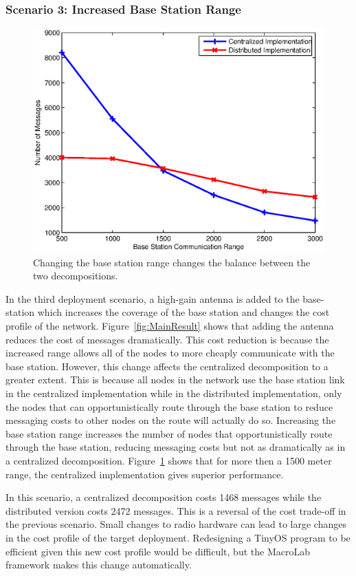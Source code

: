 \subsubsection{Scenario 3: Increased Base Station Range}

\begin{figure}
  \centering
  \includegraphics[width=0.6\columnwidth]{fig/RangeCompare}
  \caption[Effect of changing the base station range on code
  decomposition]{Changing the base station range changes the balance between the
  two decompositions.}
  \label{fig:RangeCompare}
\end{figure}

In the third deployment scenario, a high-gain antenna is added to the
base-station which increases the coverage of the base station and changes
the cost profile of the network.  Figure~\ref{fig:MainResult} shows that
adding the antenna reduces the cost of messages dramatically.  This cost
reduction is because the increased range allows all of the nodes to more
cheaply communicate with the base station.  However, this change affects
the centralized decomposition to a greater extent.  This is because all nodes in the
network use the base station link in the centralized implementation while
in the distributed implementation, only the nodes that can
opportunistically route through the base station to reduce messaging costs
to other nodes on the route will actually do so.  Increasing the base
station range increases the number of nodes that opportunistically route
through the base station, reducing messaging costs but not as dramatically
as in a centralized decomposition. Figure~\ref{fig:RangeCompare} shows
that for more then a 1500 meter range, the centralized implementation gives superior
performance. 

In this scenario, a centralized decomposition costs 1468 messages while the
distributed version costs 2472 messages. This is a reversal of the cost
trade-off in the previous scenario. Small changes to radio hardware can lead to
large changes in the cost profile of the target deployment. Redesigning a TinyOS
program to be efficient given this new cost profile would be difficult, but the
MacroLab framework makes this change automatically.

